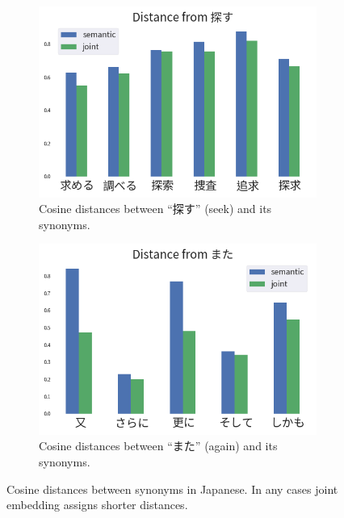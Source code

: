 \begin{CJK}{UTF8}{ipxm}
\begin{figure}[h]
        \begin{subfigure}[b]{0.45\textwidth}
            \centering
            \includegraphics[width=\textwidth]{../images/similarity_ja3.png}
            \caption{Cosine distances between ``探す'' (seek) and its synonyms.}
            \label{fig:similarity_ja3}
        \end{subfigure}
        \hspace{2em}
        \begin{subfigure}[b]{0.45\textwidth}
            \centering
            \includegraphics[width=\textwidth]{../images/similarity_ja4.png}
            \caption{Cosine distances between ``\mbox{また}'' (again) and its synonyms.}
            \label{fig:similarity_ja4}
        \end{subfigure}
        \caption[Cosine distances between synonyms in Japanese]{Cosine distances between synonyms in Japanese. In any cases joint embedding assigns shorter distances.}
        \label{fig:similarity_ja}
    \end{figure}
    \end{CJK}

